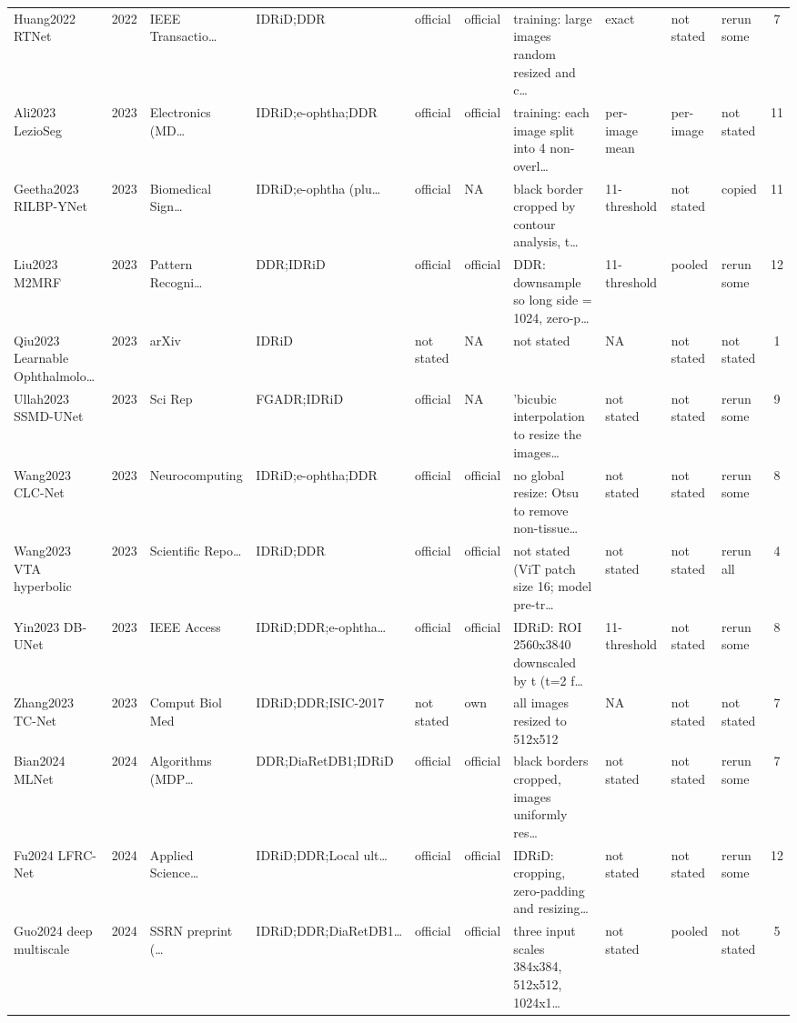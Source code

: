 \begin{landscape}
{\begin{longtable}{p{34mm} c p{20mm} p{24mm} p{14mm} p{14mm} p{48mm} p{18mm} p{14mm} p{16mm} c}
Huang2022 RTNet & 2022 & IEEE Transactio… & IDRiD;DDR & official & official & training: large images random resized and c… & exact & not stated & rerun some & 7 \\
Ali2023 LezioSeg & 2023 & Electronics (MD… & IDRiD;e-ophtha;DDR & official & official & training: each image split into 4 non-overl… & per-image mean & per-image & not stated & 11 \\
Geetha2023 RILBP-YNet & 2023 & Biomedical Sign… & IDRiD;e-ophtha (plu… & official & NA & black border cropped by contour analysis, t… & 11-threshold & not stated & copied & 11 \\
Liu2023 M2MRF & 2023 & Pattern Recogni… & DDR;IDRiD & official & official & DDR: downsample so long side = 1024, zero-p… & 11-threshold & pooled & rerun some & 12 \\
Qiu2023 Learnable Ophthalmolo… & 2023 & arXiv & IDRiD & not stated & NA & not stated & NA & not stated & not stated & 1 \\
Ullah2023 SSMD-UNet & 2023 & Sci Rep & FGADR;IDRiD & official & NA & 'bicubic interpolation to resize the images… & not stated & not stated & rerun some & 9 \\
Wang2023 CLC-Net & 2023 & Neurocomputing & IDRiD;e-ophtha;DDR & official & official & no global resize: Otsu to remove non-tissue… & not stated & not stated & rerun some & 8 \\
Wang2023 VTA hyperbolic & 2023 & Scientific Repo… & IDRiD;DDR & official & official & not stated (ViT patch size 16; model pre-tr… & not stated & not stated & rerun all & 4 \\
Yin2023 DB-UNet & 2023 & IEEE Access & IDRiD;DDR;e-ophtha… & official & official & IDRiD: ROI 2560x3840 downscaled by t (t=2 f… & 11-threshold & not stated & rerun some & 8 \\
Zhang2023 TC-Net & 2023 & Comput Biol Med & IDRiD;DDR;ISIC-2017 & not stated & own & all images resized to 512x512 & NA & not stated & not stated & 7 \\
Bian2024 MLNet & 2024 & Algorithms (MDP… & DDR;DiaRetDB1;IDRiD & official & official & black borders cropped, images uniformly res… & not stated & not stated & rerun some & 7 \\
Fu2024 LFRC-Net & 2024 & Applied Science… & IDRiD;DDR;Local ult… & official & official & IDRiD: cropping, zero-padding and resizing… & not stated & not stated & rerun some & 12 \\
Guo2024 deep multiscale & 2024 & SSRN preprint (… & IDRiD;DDR;DiaRetDB1… & official & official & three input scales 384x384, 512x512, 1024x1… & not stated & pooled & not stated & 5 \\

\end{longtable}}
\end{landscape}

